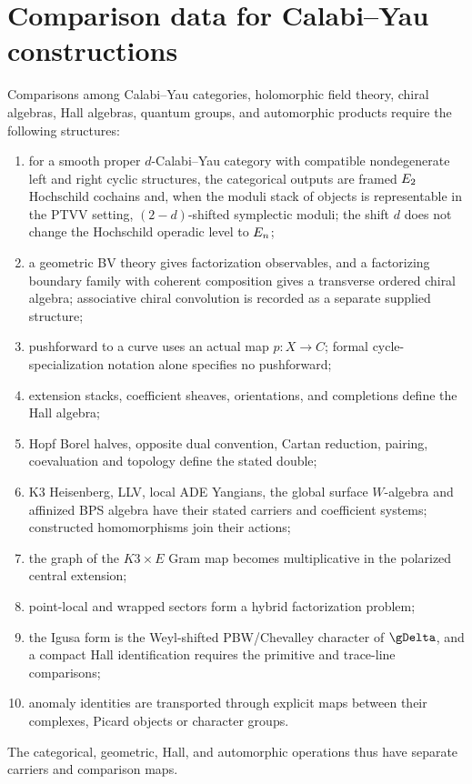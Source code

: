 \section{Comparison data for Calabi--Yau constructions}
Comparisons among Calabi--Yau categories, holomorphic field theory, chiral algebras, Hall algebras, quantum groups, and automorphic products require the following structures:
\begin{enumerate}
\item for a smooth proper $d$-Calabi--Yau category with compatible
nondegenerate left and right cyclic structures, the categorical outputs are framed $E_2$ Hochschild cochains and, when the moduli stack of objects is representable in the PTVV setting, $(2-d)$-shifted symplectic moduli; the shift $d$ does not change the Hochschild operadic level to $E_n$;
\item a geometric BV theory gives factorization observables, and a
factorizing boundary family with coherent composition gives a
transverse ordered chiral algebra; associative chiral convolution is recorded as a separate supplied structure;
\item pushforward to a curve uses an actual map $p:X\to C$; formal cycle-specialization notation alone specifies no pushforward;
\item extension stacks, coefficient sheaves, orientations, and completions define the Hall algebra;
\item Hopf Borel halves, opposite dual convention, Cartan reduction,
pairing, coevaluation and topology define the stated double;
\item K3 Heisenberg, LLV, local ADE Yangians, the global surface
$W$-algebra and affinized BPS algebra have their stated carriers and
coefficient systems; constructed homomorphisms join their actions;
\item the graph of the $K3\times E$ Gram map becomes multiplicative in the polarized central extension;
\item point-local and wrapped sectors form a hybrid factorization problem;
\item the Igusa form is the Weyl-shifted PBW/Chevalley character of $\gDelta$, and a compact Hall identification requires the primitive and trace-line comparisons;
\item anomaly identities are transported through explicit maps between
their complexes, Picard objects or character groups.
\end{enumerate}
The categorical, geometric, Hall, and automorphic operations thus have separate carriers and comparison maps.

